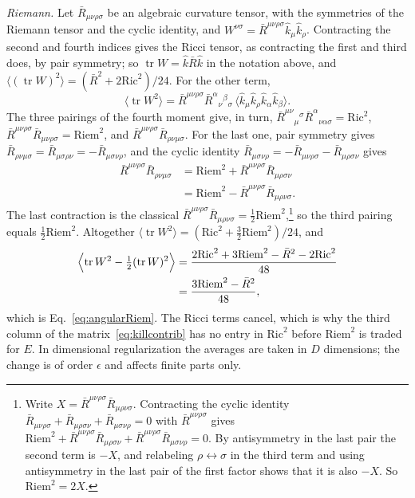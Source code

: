 \documentclass[aps,prd,10pt,twocolumn,superscriptaddress,nofootinbib,floatfix,longbibliography]{revtex4-2}
\newcommand{\Ric}{\mathrm{Ric}}
\newcommand{\Riem}{\mathrm{Riem}}
\begin{document}
\textit{Riemann.} Let $\bar R_{\mu\nu\rho\sigma}$ be an algebraic curvature tensor, with the symmetries of the Riemann tensor and the cyclic identity, and $W^{\nu\sigma}=\bar R^{\mu\nu\rho\sigma}\hat k_\mu\hat k_\rho$. Contracting the second and fourth indices gives the Ricci tensor, as contracting the first and third does, by pair symmetry; so $\operatorname{tr}W=\hat k\bar R\hat k$ in the notation above, and $\langle(\operatorname{tr}W)^2\rangle=(\bar R^2+2\Ric^2)/24$. For the other term,
\[
\langle\operatorname{tr}W^2\rangle=\bar R^{\mu\nu\rho\sigma}\bar R^{\alpha}{}_{\nu}{}^{\beta}{}_{\sigma}\,\bigl\langle\hat k_\mu\hat k_\rho\hat k_\alpha\hat k_\beta\bigr\rangle .
\]
The three pairings of the fourth moment give, in turn, $\bar R^{\mu\nu}{}_{\mu}{}^{\sigma}\bar R^{\alpha}{}_{\nu\alpha\sigma}=\Ric^2$, $\bar R^{\mu\nu\rho\sigma}\bar R_{\mu\nu\rho\sigma}=\Riem^2$, and $\bar R^{\mu\nu\rho\sigma}\bar R_{\rho\nu\mu\sigma}$. For the last one, pair symmetry gives $\bar R_{\rho\nu\mu\sigma}=\bar R_{\mu\sigma\rho\nu}=-\bar R_{\mu\sigma\nu\rho}$, and the cyclic identity $\bar R_{\mu\sigma\nu\rho}=-\bar R_{\mu\nu\rho\sigma}-\bar R_{\mu\rho\sigma\nu}$ gives
\begin{align*}
\bar R^{\mu\nu\rho\sigma}\bar R_{\rho\nu\mu\sigma}&=\Riem^2+\bar R^{\mu\nu\rho\sigma}\bar R_{\mu\rho\sigma\nu}\\
&=\Riem^2-\bar R^{\mu\nu\rho\sigma}\bar R_{\mu\rho\nu\sigma}.
\end{align*}
The last contraction is the classical $\bar R^{\mu\nu\rho\sigma}\bar R_{\mu\rho\nu\sigma}=\frac12\Riem^2$,\footnote{Write $X=\bar R^{\mu\nu\rho\sigma}\bar R_{\mu\rho\nu\sigma}$. Contracting the cyclic identity $\bar R_{\mu\nu\rho\sigma}+\bar R_{\mu\rho\sigma\nu}+\bar R_{\mu\sigma\nu\rho}=0$ with $\bar R^{\mu\nu\rho\sigma}$ gives $\Riem^2+\bar R^{\mu\nu\rho\sigma}\bar R_{\mu\rho\sigma\nu}+\bar R^{\mu\nu\rho\sigma}\bar R_{\mu\sigma\nu\rho}=0$. By antisymmetry in the last pair the second term is $-X$, and relabeling $\rho\leftrightarrow\sigma$ in the third term and using antisymmetry in the last pair of the first factor shows that it is also $-X$. So $\Riem^2=2X$.} so the third pairing equals $\frac12\Riem^2$. Altogether $\langle\operatorname{tr}W^2\rangle=(\Ric^2+\frac32\Riem^2)/24$, and
\begin{align*}
\Bigl\langle\operatorname{tr}W^2-\tfrac12(\operatorname{tr}W)^2\Bigr\rangle&=\frac{2\Ric^2+3\Riem^2-\bar R^2-2\Ric^2}{48}\\
&=\frac{3\Riem^2-\bar R^2}{48},
\end{align*}
which is Eq.~\eqref{eq:angularRiem}. The Ricci terms cancel, which is why the third column of the matrix~\eqref{eq:killcontrib} has no entry in $\Ric^2$ before $\Riem^2$ is traded for $E$. In dimensional regularization the averages are taken in $D$ dimensions; the change is of order $\epsilon$ and affects finite parts only.
\end{document}
